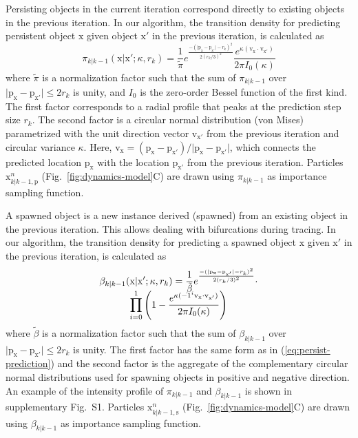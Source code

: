 \documentclass[noinfo,nocrop,final]{bioinfo}
\begin{document}
Persisting objects in the current iteration correspond directly to existing objects in the previous iteration. In our algorithm, the transition density for predicting persistent object $\mathrm{x}$ given object $\mathrm{x'}$ in the previous iteration, is calculated as
\begin{equation}
\label{eq:persist-prediction}
\pi_{k|k-1}(\mathrm{x}|\mathrm{x'}; \kappa, r_k) = \frac{1}{\tilde{\pi}} e^{\frac{-(\vert \mathrm{p}_{\mathrm{x}} - \mathrm{p}_{\mathrm{x'}}  \vert - r_k)^2  }{2 (r_k/3)^2}} \frac{e^{\kappa (\mathrm{v}_{\mathrm{x}} \cdot \mathrm{v}_{\mathrm{x'}})}}{2 \pi I_0(\kappa)}
\end{equation}
where $\tilde{\pi}$ is a normalization factor such that the sum of $\pi_{k|k-1}$ over $\vert \mathrm{p}_{\mathrm{x}} - \mathrm{p}_{\mathrm{x'}} \vert \leq 2r_k$ is unity, and $I_0$ is the zero-order Bessel function of the first kind. The first factor corresponds to a radial profile that peaks at the prediction step size $r_k$. The second factor is a circular normal distribution (von Mises) parametrized with the unit direction vector $\mathrm{v}_{\mathrm{x'}}$ from the previous iteration and circular variance $\kappa$. Here, $\mathrm{v}_{\mathrm{x}} = (\mathrm{p}_{\mathrm{x}} - \mathrm{p}_{\mathrm{x'}})/\vert \mathrm{p}_{\mathrm{x}} - \mathrm{p}_{\mathrm{x'}} \vert$, which connects the predicted location $\mathrm{p}_{\mathrm{x}}$ with the location $\mathrm{p}_{\mathrm{x'}}$ from the previous iteration. Particles $\mathrm{x}_{k|k-1,\mathrm{p}}^{n}$ (Fig.~\ref{fig:dynamics-model}C) are drawn using $\pi_{k|k-1}$ as importance sampling function.

A spawned object is a new instance derived (spawned) from an existing object in the previous iteration. This allows dealing with bifurcations during tracing. In our algorithm, the transition density for predicting a spawned object $\mathrm{x}$ given $\mathrm{x'}$ in the previous iteration, is calculated as
\begin{multline}
\label{eq:spawn-prediction}
\beta_{k|k-1}(\mathrm{x}|\mathrm{x'}; \kappa, r_k) = \frac{1}{\tilde{\beta}} e^{\frac{-(\vert \mathrm{p}_{\mathrm{x}} - \mathrm{p}_{\mathrm{x'}} \vert-r_k)^2}{2(r_k/3)^2}} \cdot \\[-0.5\baselineskip]
\prod\limits_{i=0}^{1} \left( 1 - \frac{e^{\kappa (-1^i \mathrm{v}_{\mathrm{x}} \cdot \mathrm{v}_{\mathrm{x'}})}}{2 \pi I_0(\kappa)} \right)
\end{multline}
where $\tilde{\beta}$ is a normalization factor such that the sum of $\beta_{k|k-1}$ over $\vert \mathrm{p}_{\mathrm{x}} - \mathrm{p}_{\mathrm{x'}} \vert \leq 2r_k$ is unity. The first factor has the same form as in (\ref{eq:persist-prediction}) and the second factor is the aggregate of the complementary circular normal distributions used for spawning objects in positive and negative direction. An example of the intensity profile of $\pi_{k|k-1}$ and $\beta_{k|k-1}$ is shown in supplementary Fig.~S1. Particles $\mathrm{x}_{k|k-1,\mathrm{s}}^{n}$ (Fig.~\ref{fig:dynamics-model}C) are drawn using $\beta_{k|k-1}$ as importance sampling function.
\end{document}
